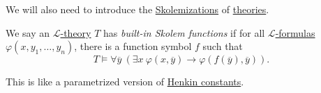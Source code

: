 We will also need to introduce the \hyperref[not:Skolemization]{Skolemizations} of \hyperref[def:theory]{theories}.

\begin{definition}\label{def:built-in-Skolem-function}
	We say an \hyperref[def:theory]{\(\mathcal{L} \)-theory} \(T\) has \emph{built-in Skolem functions} if for all \hyperref[def:formula]{\(\mathcal{L} \)-formulas} \(\varphi (x, y_1, \dots , y_n)\), there is a function symbol \(f\) such that
	\[
		T\models \forall \overline{y} \ (\exists x\ \varphi (x, \overline{y} ) \to \varphi (f(\overline{y} ), \overline{y} )).
	\]
\end{definition}

\begin{intuition}
	This is like a parametrized version of \hyperref[def:Henkin-constant]{Henkin constants}.
\end{intuition}


